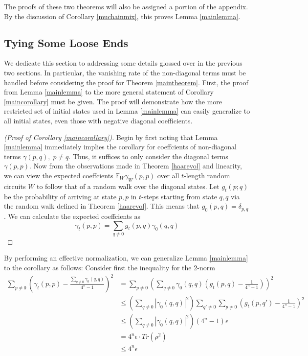 \documentclass[12pt]{amsart}
\theoremstyle{definition}
\theoremstyle{remark}
\numberwithin{equation}{section}
\theoremstyle{remark}
\begin{document}
The proofs of these two theorems will also be assigned a portion of the appendix.
By the discussion of Corollary \ref{muchainmix}, this proves Lemma \ref{mainlemma}.

\subsection{Tying Some Loose Ends}
We dedicate this section to addressing some details glossed over in the previous two sections. In particular, the vanishing rate of the non-diagonal terms must be handled before considering the proof for Theorem \ref{maintheorem}. First, the proof from Lemma \ref{mainlemma} to the more general statement of Corollary \ref{maincorollary} must be given. The proof will demonstrate how the more restricted set of initial states used in Lemma \ref{mainlemma} can easily generalize to all initial states, even those with negative diagonal coefficients.
%
\begin{proof}[(Proof of Corollary \ref{maincorollary})]
 Begin by first noting that Lemma \ref{mainlemma} immediately implies the corollary for coeffcients of non-diagonal terms $\gamma(p,q), \; p \neq q$. Thus, it suffices to only consider the diagonal terms $\gamma(p,p)$. Now from the observations made in Theorem \ref{haarevol} and linearity, we can view the expected coeffcients $\mathbb{E}_{W}\gamma_W(p,p)$ over all $t$-length random circuits $W$ to follow that of a random walk over the diagonal states. Let $g_t(p;q)$ be the probability of arriving at state $p,p$ in $t$-steps starting from state $q,q$ via the random walk defined in Theorem \ref{haarevol}. This means that $g_0(p,q) = \delta_{p,q}$. We can calculate the expected coeffcients as
 \begin{equation}
   \gamma_t(p,p) = \sum_{q \neq 0} g_t(p,q)\gamma_0(q,q)
 \end{equation}
\end{proof}
By performing an effective normalization, we can generalize Lemma \ref{mainlemma} to the corollary as follows: Consider first the inequality for the 2-norm
%
\begin{align*}
\sum_{p \neq 0} \left( \gamma_t(p,p) - \frac{\sum_{q \neq 0} \gamma_0(q,q)}{4^n -1}\right)^2
& = \sum_{p \neq 0} \left(\sum_{q\neq 0} \gamma_0(q,q) \left( g_t(p,q) - \frac{1}{4^n -1} \right)\right)^2 \\
& \leq \left( \sum_{q \neq 0} |\gamma_0(q,q)|^2 \right) \sum_{q' \neq 0} \sum_{p \neq 0 }\left( g_t(p,q') - \frac{1}{4^n -1} \right)^2 \\
& \leq  \left( \sum_{q \neq 0} |\gamma_0(q,q)|^2 \right) (4^n -1)\epsilon \\
& = 4^n\epsilon \cdot Tr(\rho^2) \\
& \leq 4^n \epsilon
\end{align*}
\end{document}
